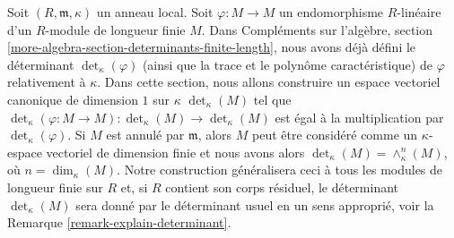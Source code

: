 \medskip\noindent
Soit $(R, \mathfrak m, \kappa)$ un anneau local. Soit
$\varphi : M \to M$ un endomorphisme $R$-linéaire d'un
$R$-module de longueur finie $M$. Dans Compléments sur l'algèbre, section
\ref{more-algebra-section-determinants-finite-length},
nous avons déjà défini le déterminant $\det_\kappa(\varphi)$
(ainsi que la trace et le polynôme caractéristique)
de $\varphi$ relativement à $\kappa$. Dans cette section, nous allons
construire un espace vectoriel canonique de dimension $1$ sur $\kappa$
$\det_\kappa(M)$ tel que
$\det_\kappa(\varphi : M \to M) : \det_\kappa(M) \to \det_\kappa(M)$
est égal à la multiplication par $\det_\kappa(\varphi)$.
Si $M$ est annulé par $\mathfrak m$, alors $M$ peut être considéré
comme un $\kappa$-espace vectoriel de dimension finie et nous avons alors
$\det_\kappa(M) = \wedge^n_\kappa(M)$, où $n = \dim_\kappa(M)$.
Notre construction généralisera ceci à tous les modules de longueur finie
sur $R$ et, si $R$ contient son corps résiduel, le déterminant
$\det_\kappa(M)$ sera donné par le déterminant usuel en un sens
approprié, voir la Remarque \ref{remark-explain-determinant}.

